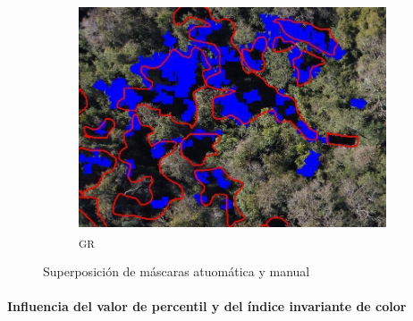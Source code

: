 \begin{figure}
 \begin{subfigure}[b]{0.3\textwidth}
    \includegraphics[width=\textwidth]{Imagenes/green minus red 85.png}
     \hfill
     \caption{\textpsi\textsubscript{GR}}
    \label{verderojo}
 \end{subfigure}
 \caption{Superposición de máscaras atuomática y manual}
        \label{p85BRBGGR}
\end{figure}

\paragraph{Influencia del valor de percentil y del índice invariante de color}

